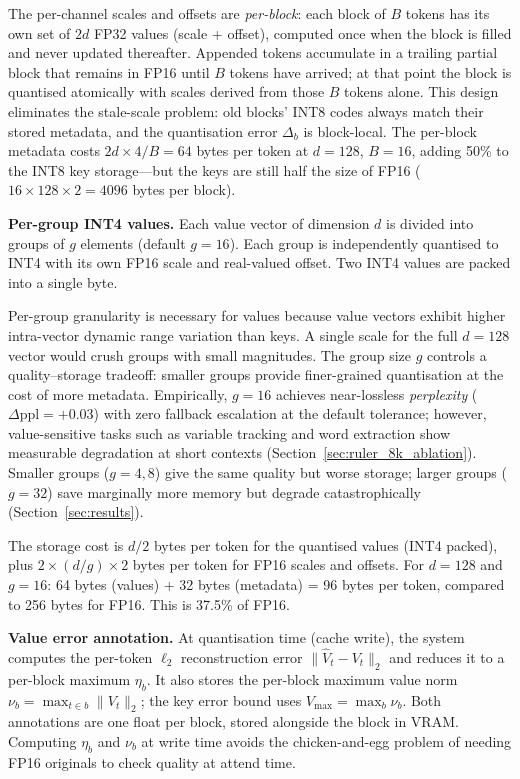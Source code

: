 \documentclass[11pt,a4paper]{article}
\theoremstyle{definition}
\theoremstyle{remark}
\newcommand{\norm}[1]{\lVert #1 \rVert}
\begin{document}
The per-channel scales and offsets are \emph{per-block}: each block of $B$ tokens has its own set of $2d$ FP32 values (scale + offset), computed once when the block is filled and never updated thereafter.  Appended tokens accumulate in a trailing partial block that remains in FP16 until $B$ tokens have arrived; at that point the block is quantised atomically with scales derived from those $B$ tokens alone.  This design eliminates the stale-scale problem: old blocks' INT8 codes always match their stored metadata, and the quantisation error $\Delta_b$ is block-local.  The per-block metadata costs $2d \times 4 / B = 64$ bytes per token at $d{=}128$, $B{=}16$, adding 50\% to the INT8 key storage---but the keys are still half the size of FP16 ($16 \times 128 \times 2 = 4096$ bytes per block).

\textbf{Per-group INT4 values.}  Each value vector of dimension $d$ is divided into groups of $g$ elements (default $g = 16$).  Each group is independently quantised to INT4 with its own FP16 scale and real-valued offset.  Two INT4 values are packed into a single byte.

Per-group granularity is necessary for values because value vectors exhibit higher intra-vector dynamic range variation than keys.  A single scale for the full $d{=}128$ vector would crush groups with small magnitudes.  The group size $g$ controls a quality--storage tradeoff: smaller groups provide finer-grained quantisation at the cost of more metadata.  Empirically, $g{=}16$ achieves near-lossless \emph{perplexity} ($\Delta\text{ppl} = +0.03$) with zero fallback escalation at the default tolerance; however, value-sensitive tasks such as variable tracking and word extraction show measurable degradation at short contexts (Section~\ref{sec:ruler_8k_ablation}).  Smaller groups ($g{=}4, 8$) give the same quality but worse storage; larger groups ($g{=}32$) save marginally more memory but degrade catastrophically (Section~\ref{sec:results}).

The storage cost is $d/2$ bytes per token for the quantised values (INT4 packed), plus $2 \times (d/g) \times 2$ bytes per token for FP16 scales and offsets.  For $d{=}128$ and $g{=}16$: 64 bytes (values) + 32 bytes (metadata) = 96 bytes per token, compared to 256 bytes for FP16.  This is 37.5\% of FP16.

\textbf{Value error annotation.}  At quantisation time (cache write), the system computes the per-token $\ell_2$ reconstruction error $\norm{\hat{V}_t - V_t}_2$ and reduces it to a per-block maximum $\eta_b$.  It also stores the per-block maximum value norm $\nu_b = \max_{t \in b}\norm{V_t}_2$; the key error bound uses $V_{\max} = \max_b \nu_b$.  Both annotations are one float per block, stored alongside the block in VRAM\@.  Computing $\eta_b$ and $\nu_b$ at write time avoids the chicken-and-egg problem of needing FP16 originals to check quality at attend time.
\end{document}
